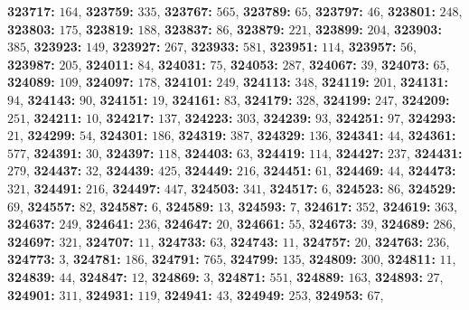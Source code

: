 \textsf{\bfseries 323717:} $164$, \textsf{\bfseries 323759:} $335$, \textsf{\bfseries 323767:} $565$, \textsf{\bfseries 323789:} $65$, \textsf{\bfseries 323797:} $46$, \textsf{\bfseries 323801:} $248$, \textsf{\bfseries 323803:} $175$, \textsf{\bfseries 323819:} $188$, \textsf{\bfseries 323837:} $86$, \textsf{\bfseries 323879:} $221$, \textsf{\bfseries 323899:} $204$, \textsf{\bfseries 323903:} $385$, \textsf{\bfseries 323923:} $149$, \textsf{\bfseries 323927:} $267$, \textsf{\bfseries 323933:} $581$, \textsf{\bfseries 323951:} $114$, \textsf{\bfseries 323957:} $56$, \textsf{\bfseries 323987:} $205$, \textsf{\bfseries 324011:} $84$, \textsf{\bfseries 324031:} $75$, \textsf{\bfseries 324053:} $287$, \textsf{\bfseries 324067:} $39$, \textsf{\bfseries 324073:} $65$, \textsf{\bfseries 324089:} $109$, \textsf{\bfseries 324097:} $178$, \textsf{\bfseries 324101:} $249$, \textsf{\bfseries 324113:} $348$, \textsf{\bfseries 324119:} $201$, \textsf{\bfseries 324131:} $94$, \textsf{\bfseries 324143:} $90$, \textsf{\bfseries 324151:} $19$, \textsf{\bfseries 324161:} $83$, \textsf{\bfseries 324179:} $328$, \textsf{\bfseries 324199:} $247$, \textsf{\bfseries 324209:} $251$, \textsf{\bfseries 324211:} $10$, \textsf{\bfseries 324217:} $137$, \textsf{\bfseries 324223:} $303$, \textsf{\bfseries 324239:} $93$, \textsf{\bfseries 324251:} $97$, \textsf{\bfseries 324293:} $21$, \textsf{\bfseries 324299:} $54$, \textsf{\bfseries 324301:} $186$, \textsf{\bfseries 324319:} $387$, \textsf{\bfseries 324329:} $136$, \textsf{\bfseries 324341:} $44$, \textsf{\bfseries 324361:} $577$, \textsf{\bfseries 324391:} $30$, \textsf{\bfseries 324397:} $118$, \textsf{\bfseries 324403:} $63$, \textsf{\bfseries 324419:} $114$, \textsf{\bfseries 324427:} $237$, \textsf{\bfseries 324431:} $279$, \textsf{\bfseries 324437:} $32$, \textsf{\bfseries 324439:} $425$, \textsf{\bfseries 324449:} $216$, \textsf{\bfseries 324451:} $61$, \textsf{\bfseries 324469:} $44$, \textsf{\bfseries 324473:} $321$, \textsf{\bfseries 324491:} $216$, \textsf{\bfseries 324497:} $447$, \textsf{\bfseries 324503:} $341$, \textsf{\bfseries 324517:} $6$, \textsf{\bfseries 324523:} $86$, \textsf{\bfseries 324529:} $69$, \textsf{\bfseries 324557:} $82$, \textsf{\bfseries 324587:} $6$, \textsf{\bfseries 324589:} $13$, \textsf{\bfseries 324593:} $7$, \textsf{\bfseries 324617:} $352$, \textsf{\bfseries 324619:} $363$, \textsf{\bfseries 324637:} $249$, \textsf{\bfseries 324641:} $236$, \textsf{\bfseries 324647:} $20$, \textsf{\bfseries 324661:} $55$, \textsf{\bfseries 324673:} $39$, \textsf{\bfseries 324689:} $286$, \textsf{\bfseries 324697:} $321$, \textsf{\bfseries 324707:} $11$, \textsf{\bfseries 324733:} $63$, \textsf{\bfseries 324743:} $11$, \textsf{\bfseries 324757:} $20$, \textsf{\bfseries 324763:} $236$, \textsf{\bfseries 324773:} $3$, \textsf{\bfseries 324781:} $186$, \textsf{\bfseries 324791:} $765$, \textsf{\bfseries 324799:} $135$, \textsf{\bfseries 324809:} $300$, \textsf{\bfseries 324811:} $11$, \textsf{\bfseries 324839:} $44$, \textsf{\bfseries 324847:} $12$, \textsf{\bfseries 324869:} $3$, \textsf{\bfseries 324871:} $551$, \textsf{\bfseries 324889:} $163$, \textsf{\bfseries 324893:} $27$, \textsf{\bfseries 324901:} $311$, \textsf{\bfseries 324931:} $119$, \textsf{\bfseries 324941:} $43$, \textsf{\bfseries 324949:} $253$, \textsf{\bfseries 324953:} $67$, 
